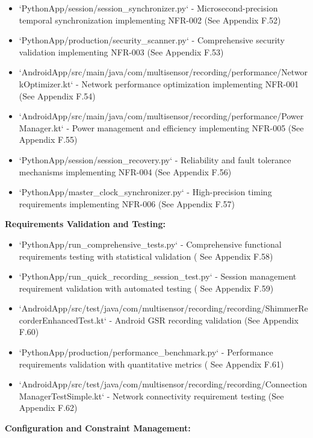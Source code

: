 \documentclass[11pt,a4paper]{report}
\begin{document}
\begin{itemize}
\item `PythonApp/session/session_synchronizer.py` - Microsecond-precision temporal synchronization implementing
  NFR-002 (See Appendix F.52)
\item `PythonApp/production/security_scanner.py` - Comprehensive security validation implementing NFR-003 (See Appendix
  F.53)
\item `AndroidApp/src/main/java/com/multisensor/recording/performance/NetworkOptimizer.kt` - Network performance
  optimization implementing NFR-001 (See Appendix F.54)
\item `AndroidApp/src/main/java/com/multisensor/recording/performance/PowerManager.kt` - Power management and efficiency
  implementing NFR-005 (See Appendix F.55)
\item `PythonApp/session/session_recovery.py` - Reliability and fault tolerance mechanisms implementing NFR-004 (See
  Appendix F.56)
\item `PythonApp/master_clock_synchronizer.py` - High-precision timing requirements implementing NFR-006 (See Appendix
  F.57)

\end{itemize}
\textbf{Requirements Validation and Testing:}

\begin{itemize}
\item `PythonApp/run_comprehensive_tests.py` - Comprehensive functional requirements testing with statistical validation (
  See Appendix F.58)
\item `PythonApp/run_quick_recording_session_test.py` - Session management requirement validation with automated testing (
  See Appendix F.59)
\item `AndroidApp/src/test/java/com/multisensor/recording/recording/ShimmerRecorderEnhancedTest.kt` - Android GSR recording
  validation (See Appendix F.60)
\item `PythonApp/production/performance_benchmark.py` - Performance requirements validation with quantitative metrics (
  See Appendix F.61)
\item `AndroidApp/src/test/java/com/multisensor/recording/recording/ConnectionManagerTestSimple.kt` - Network connectivity
  requirement testing (See Appendix F.62)

\end{itemize}
\textbf{Configuration and Constraint Management:}
\end{document}
